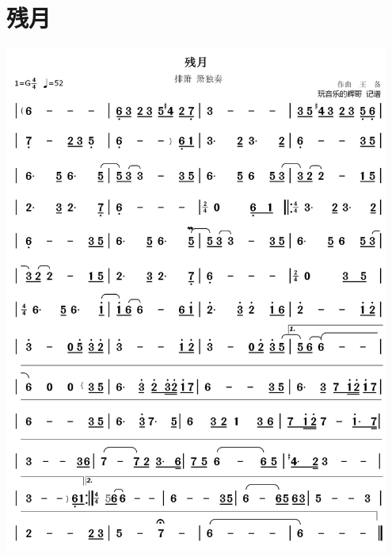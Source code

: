 \documentclass[cn,pad,twocol]{elegantbook}
\begin{document}
\section{残月}      \includegraphics[width=0.95\textwidth]{dongxiao/20200909-残月.jpg}
\end{document}
